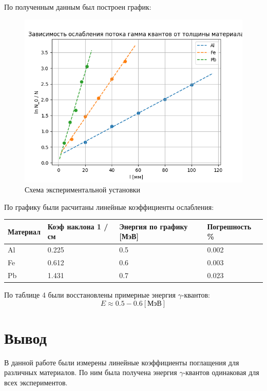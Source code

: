 \documentclass[a4paper,12pt]{article} %
\begin{document}
			По полученным данным был построен график:
			\begin{figure}[h!]
                \centering
                \includegraphics[width=15cm]{img/Graph.png}
                \caption{Схема экспериментальной установки}
                \label{graph1}
            \end{figure}
	\newpage
			По графику были расчитаны линейные коэффициенты ослабления:
			\begin{table}[h!]
				\centering
				\begin{tabular}{|l|l|l|l|}
				\hline
				Материал & Коэф наклона 1 / см & Энергия по графику [МэВ] & Погрешность \% \\ \hline
				Al       & 0.225               & 0.5			& 0.002          \\ \hline
				Fe       & 0.612               & 0.6			& 0.003          \\ \hline
				Pb       & 1.431               & 0.7			& 0.023          \\ \hline
				\end{tabular}
			\end{table}\par
			По таблице 4 были восстановлены примерные энергия $\gamma$-квантов:
			\begin{equation}
				E \approx 0.5 - 0.6 [\text{МэВ}]
			\end{equation} 
	
	\section{Вывод}
		
		В данной работе были измерены линейные коэффициенты поглащения для различных материалов.
		По ним была получена энергия $\gamma$-квантов одинаковая для всех экспериментов.
		 
\end{document}
